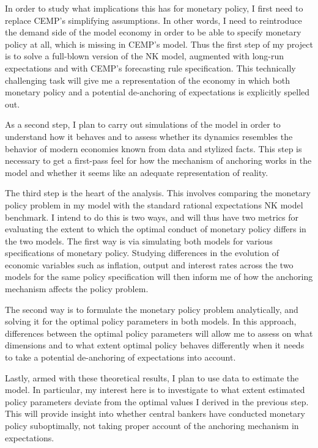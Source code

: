 \documentclass[11pt]{article}
\renewcommand{\[}{\begin{equation}}
\renewcommand{\]}{\end{equation}}
\begin{document}
In order to study what implications this has for monetary policy, I first need to replace CEMP's simplifying assumptions. In other words, I need to reintroduce the demand side of the model economy in order to be able to specify monetary policy at all, which is missing in CEMP's model.  Thus the first step of my project is to solve a full-blown version of the NK model, augmented with long-run expectations and with CEMP's forecasting rule specification. This technically challenging task will give me a representation of the economy in which both monetary policy and a potential de-anchoring of expectations is explicitly spelled out.

As a second step, I plan to carry out simulations of the model in order to understand how it behaves and to assess whether its dynamics resembles the behavior of modern economies known from data and stylized facts. This step is necessary to get a first-pass feel for how the mechanism of anchoring works in the model and whether it seems like an adequate representation of reality.

The third step is the heart of the analysis. This involves comparing the monetary policy problem in my model with the standard rational expectations NK model benchmark. I intend to do this is two ways, and will thus have two metrics for evaluating the extent to which the optimal conduct of monetary policy differs in the two models. The first way is via simulating both models for various specifications of monetary policy. Studying differences in the evolution of economic variables such as inflation, output and interest rates across the two models for the same policy specification will then inform me of how the anchoring mechanism affects the policy problem. 

The second way is to formulate the monetary policy problem analytically, and solving it for the optimal policy parameters in both models. In this approach, differences between the optimal policy parameters will allow me to assess on what dimensions and to what extent optimal policy behaves differently when it needs to take a potential de-anchoring of expectations into account.  

Lastly, armed with these theoretical results, I plan to use data to estimate the model. In particular, my interest here is to investigate to what extent estimated policy parameters deviate from the optimal values I derived in the previous step. This will provide insight into whether central bankers have conducted monetary policy suboptimally, not taking proper account of the anchoring mechanism in expectations.    
 
\end{document}
